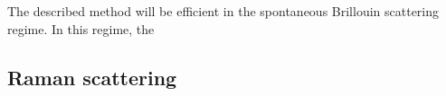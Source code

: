 \documentclass{standalone}
\begin{document}
The described method will be efficient in the spontaneous Brillouin scattering regime. In this regime, the %


\subsection{Raman scattering}









\setcounter{stranica}{\thepage}
\addtocounter{stranica}{1}
\end{document}
